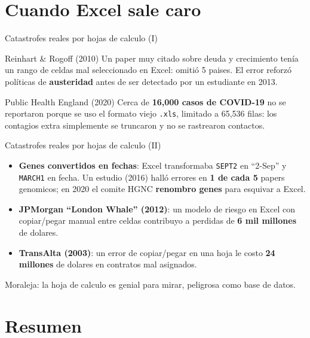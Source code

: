 \documentclass[aspectratio=169]{beamer}
\begin{document}
\section{Cuando Excel sale caro}

\begin{frame}{Catastrofes reales por hojas de calculo (I)}
  \begin{block}{Reinhart \& Rogoff (2010)}
    Un paper muy citado sobre deuda y crecimiento ten\'ia un rango de celdas
    mal seleccionado en Excel: omiti\'o 5 paises. El error reforz\'o pol\'iticas
    de \textbf{austeridad} antes de ser detectado por un estudiante en 2013.
  \end{block}
  \begin{block}{Public Health England (2020)}
    Cerca de \textbf{16,000 casos de COVID-19} no se reportaron porque se uso
    el formato viejo \texttt{.xls}, limitado a 65,536 filas: los contagios
    extra simplemente se truncaron y no se rastrearon contactos.
  \end{block}
\end{frame}

\begin{frame}{Catastrofes reales por hojas de calculo (II)}
  \begin{itemize}
    \item \textbf{Genes convertidos en fechas}: Excel transformaba \texttt{SEPT2}
          en ``2-Sep'' y \texttt{MARCH1} en fecha. Un estudio (2016) hall\'o
          errores en \textbf{1 de cada 5} papers genomicos; en 2020 el comite
          HGNC \textbf{renombro genes} para esquivar a Excel.
    \item \textbf{JPMorgan ``London Whale'' (2012)}: un modelo de riesgo en Excel
          con copiar/pegar manual entre celdas contribuyo a perdidas de
          \textbf{6 mil millones} de dolares.
    \item \textbf{TransAlta (2003)}: un error de copiar/pegar en una hoja le costo
          \textbf{24 millones} de dolares en contratos mal asignados.
  \end{itemize}
  \vspace{0.3em}
  Moraleja: la hoja de calculo es genial para mirar, peligrosa como base de datos.
\end{frame}

\section{Resumen}
\end{document}
